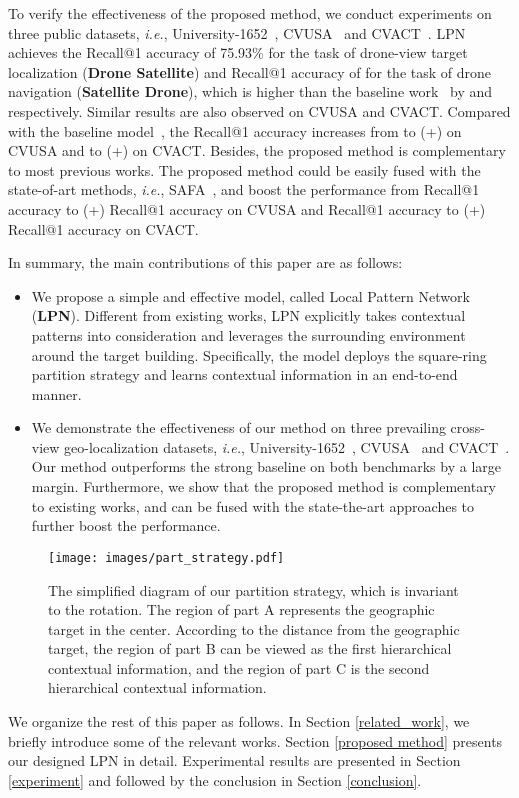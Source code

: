 \documentclass[journal]{IEEEtran}
\def\ie{\emph{i.e.}}
\begin{document}
To verify the effectiveness of the proposed method, we conduct experiments on three public datasets, \ie, University-1652~\cite{zheng_university-1652_nodate}, CVUSA~\cite{zhai_predicting_2017} and CVACT~\cite{liu_lending_2019}. LPN achieves the Recall@1 accuracy of 75.93\% for the task of drone-view target localization (\textbf{Drone  Satellite}) and Recall@1 accuracy of  for the task of drone navigation (\textbf{Satellite  Drone}), which is higher than the baseline work~\cite{zheng_university-1652_nodate} by  and  respectively. Similar results are also observed on CVUSA and CVACT. Compared with the baseline model~\cite{zheng_university-1652_nodate}, the Recall@1 accuracy increases from  to  (+) on CVUSA and  to  (+) on CVACT.
Besides, the proposed method is complementary to most previous works. The proposed method could be easily fused with the state-of-art methods, \ie, SAFA~\cite{shi_spatial-aware_nodate}, and boost the performance from  Recall@1 accuracy to  (+) Recall@1 accuracy on CVUSA and  Recall@1 accuracy to  (+) Recall@1 accuracy on CVACT.
\par
In summary, the main contributions of this paper are as follows:
\begin{itemize}
\setlength\itemsep{0em}
\item We propose a simple and effective model, called Local Pattern Network (\textbf{LPN}). Different from existing works, LPN explicitly takes contextual patterns into consideration and leverages the surrounding environment around the target building. Specifically, the model deploys the square-ring partition strategy and learns contextual information in an end-to-end manner. 
\item We demonstrate the effectiveness of our method on three prevailing cross-view geo-localization datasets, \ie, University-1652~\cite{zheng_university-1652_nodate}, CVUSA~\cite{zhai_predicting_2017} and CVACT~\cite{liu_lending_2019}. Our method outperforms the strong baseline on both benchmarks by a large margin. Furthermore, we show that the proposed method is complementary to existing works, and can be fused with the state-the-art approaches to further boost the  performance.
\end{itemize}
\begin{figure}[htp]
  \centering
  \texttt{[image: images/part\_strategy.pdf]}
  \caption{The simplified diagram of our partition strategy, which is invariant to the rotation. The region of part A represents the geographic target in the center. According to the distance from the geographic target, the region of part B can be viewed as the first hierarchical contextual information, and the region of part C is the second hierarchical contextual information. 
  }
  \label{fig:part_strategy}
\end{figure}
\par
We organize the rest of this paper as follows. In Section \ref{related_work}, we briefly introduce some of the relevant works. Section \ref{proposed method} presents our designed LPN in detail. Experimental results are presented in Section \ref{experiment} and followed by the conclusion in Section \ref{conclusion}.
\end{document}
